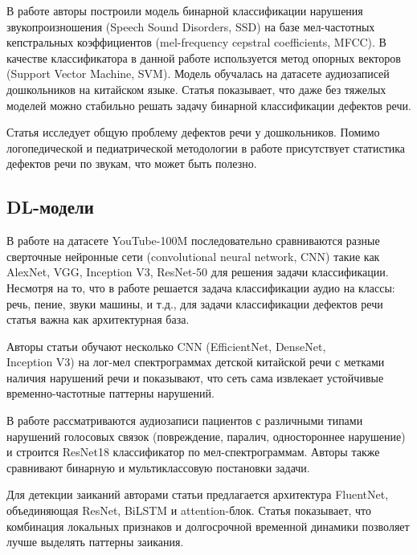 \documentclass[a4paper,14pt]{extarticle}
\begin{document}
В работе \textbf{\cite{ng2022_child_ssd_posterior}} авторы построили модель бинарной классификации нарушения звукопроизношения (Speech Sound Disorders, SSD) на базе мел-частотных кепстральных коэффициентов (mel-frequency cepstral coefficients, MFCC). В качестве классификатора в данной работе используется метод опорных векторов (Support Vector Machine, SVM). Модель обучалась на датасете аудиозаписей дошкольников на китайском языке. Статья показывает, что даже без тяжелых моделей можно стабильно решать задачу бинарной классификации дефектов речи.

Статья \textbf{\cite{khomenko2024_diag_doshkolniki}} исследует общую проблему дефектов речи у дошкольников. Помимо логопедической и педиатрической методологии в работе присутствует статистика дефектов речи по звукам, что может быть полезно.

\subsection{DL-модели}

В работе \textbf{\cite{hershey2017_cnn_audio}} на датасете YouTube-100M последовательно сравниваются разные сверточные нейронные сети (convolutional neural network, CNN) такие как AlexNet, VGG, Inception V3, ResNet-50 для решения задачи классификации. Несмотря на то, что в работе решается задача классификации аудио на классы: речь, пение, звуки машины, и т.д., для задачи классификации дефектов речи статья важна как архитектурная база.

Авторы статьи \textbf{\cite{kuo2022_chinese_ssd}} обучают несколько CNN (EfficientNet, DenseNet, \\ Inception V3) на лог-мел спектрограммах детской китайской речи с метками наличия нарушений речи и показывают, что сеть сама извлекает устойчивые временно-частотные паттерны нарушений.

В работе \textbf{\cite{voice_disorders_deeplearning_2025}} рассматриваются аудиозаписи пациентов с различными типами нарушений голосовых связок (повреждение, паралич, одностороннее нарушение) и строится ResNet18 классификатор по мел-спектрограммам. Авторы также сравнивают бинарную и мультиклассовую постановки задачи.

Для детекции заиканий авторами статьи \textbf{\cite{kourkounakis2021_fluentnet}} предлагается архитектура FluentNet, объединяющая ResNet, BiLSTM и attention-блок. Статья показывает, что комбинация локальных признаков и долгосрочной временной динамики позволяет лучше выделять паттерны заикания.
\end{document}
